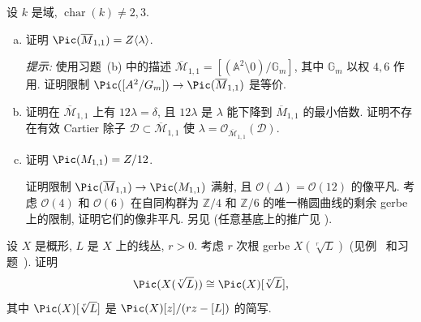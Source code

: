 \begin{exercise}\label{src:7.1.21}
设 $k$ 是域, $\operatorname{char}(k)\neq2,3$.
\begin{enumerate}[(a)]
\item 证明 $\Pic(\overline{\mathcal M}_{1,1})=\mathbb Z\langle\lambda\rangle$.

\textit{提示:} 使用习题~(b) 中的描述 $\overline{\mathcal M}_{1,1}=[(\mathbb A^2\setminus0)/\mathbb G_m]$, 其中 $\mathbb G_m$ 以权 $4,6$ 作用. 证明限制 $\Pic([\mathbb A^2/\mathbb G_m])\to\Pic(\overline{\mathcal M}_{1,1})$ 是等价.
\item 证明在 $\overline{\mathcal M}_{1,1}$ 上有 $12\lambda=\delta$, 且 $12\lambda$ 是 $\lambda$ 能下降到 $\overline M_{1,1}$ 的最小倍数. 证明不存在有效 Cartier 除子 $\mathcal D\subset\overline{\mathcal M}_{1,1}$ 使 $\lambda=\mathcal O_{\overline{\mathcal M}_{1,1}}(\mathcal D)$.
\item 证明 $\Pic(\mathcal M_{1,1})=\mathbb Z/12$.

证明限制 $\Pic(\overline{\mathcal M}_{1,1})\to\Pic(\mathcal M_{1,1})$ 满射, 且 $\mathcal O(\Delta)=\mathcal O(12)$ 的像平凡. 考虑 $\mathcal O(4)$ 和 $\mathcal O(6)$ 在自同构群为 $\mathbb Z/4$ 和 $\mathbb Z/6$ 的唯一椭圆曲线的剩余 gerbe 上的限制, 证明它们的像非平凡. 另见 \cite{Mum65} (任意基底上的推广见 \cite{FO10}).
\end{enumerate}
\end{exercise}
\begin{exercise}\label{src:7.1.22}
设 $X$ 是概形, $L$ 是 $X$ 上的线丛, $r>0$. 考虑 $r$ 次根 gerbe $X(\sqrt[r]{L})$ (见例~ 和习题~). 证明
\[
\Pic(X(\sqrt[r]{L}))\cong\Pic(X)[\sqrt[r]{L}],
\]
其中 $\Pic(X)[\sqrt[r]{L}]$ 是 $\Pic(X)[z]/(rz-[L])$ 的简写.
\end{exercise}
